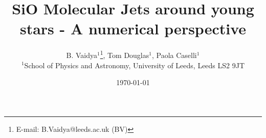 \documentclass[useAMS,usenatbib]{mn2e}
\begin{document}
\title{SiO Molecular Jets around young stars - A numerical perspective}
\author[B. Vaidya, Tom Douglas, Paola Caselli]{B. Vaidya$^{1}$\thanks{E-mail:
B.Vaidya@leeds.ac.uk (BV)}, Tom Douglas$^{1}$, Paola Caselli$^{1}$\\
$^{1}$School of Physics and Astronomy, University of Leeds, Leeds LS2
9JT\\
}

\date\today

\pagerange{\pageref{firstpage}--\pageref{lastpage}} 


\maketitle

\label{firstpage}
\end{document}
